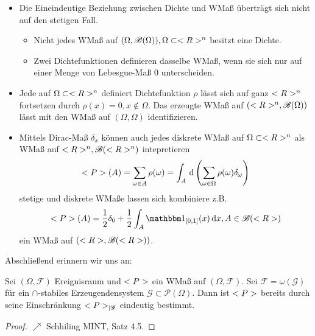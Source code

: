 \begin{*remark}
	\begin{itemize}
		\item Die Eineindeutige Beziehung zwischen Dichte und WMaß überträgt sich nicht auf den stetigen Fall.
		\begin{itemize}
			\item Nicht jedes WMaß auf $(\Omega, \mathscr{B}(\Omega)), \Omega \subset <R>^n$ besitzt eine Dichte.
			\item Zwei Dichtefunktionen definieren dasselbe WMaß, wenn sie sich nur auf einer Menge von Lebesgue-Maß $0$ unterscheiden.
		\end{itemize}
		\item Jede auf $\Omega \subset <R>^n$ definiert Dichtefunktion $\rho$ lässt sich auf ganz $<R>^n$ fortsetzen durch $\rho(x) = 0, x \not\in \Omega$. Das erzeugte WMaß auf $(<R>^n, \mathscr{B}(\Omega))$ lässt mit den WMaß auf $(\Omega, \mathscr{\Omega})$ identifizieren.
		\item Mittels Dirac-Maß $\delta_{x}$ können auch jedes diskrete WMaß auf $\Omega \subset <R>^n$ als WMaß auf $<R>^n, \mathscr{B}(<R>^n)$ intepretieren
		\begin{align}
			<P>(A) = \sum_{\omega \in A} \rho(\omega) = \int_{A} \,\mathrm{d} \left( \sum_{\omega \in \Omega} \rho(\omega)\delta_{\omega} \right)\notag
		\end{align}
		stetige und diskrete WMaße lassen sich kombiniere z.B.
		\begin{align}
			\probp(A) = \frac{1}{2} \delta_{0} + \frac{1}{2} \int_{A}\indi_{[0,1]}(x)\diff x, A \in \mathscr{B}(\R)\notag
		\end{align}
		ein WMaß auf $(<R>, \mathscr{B}(<R>))$.
	\end{itemize}
\end{*remark}

Abschließend erinnern wir uns an:

\begin{proposition}
	Sei $(\Omega, \mathscr{F})$ Ereignisraum und $<P>$ ein WMaß auf $(\Omega, \mathscr{F})$. 
	Sei $\mathscr{F} = \omega(\mathscr{G})$ für ein $\cap$-stabiles Erzeugendensystem $\mathscr{G} \subset \mathscr{P}(\Omega)$. 
	Dann ist $<P>$ bereits durch seine Einschränkung $<P>_{\mid \mathscr{G}}$ eindeutig bestimmt.
\end{proposition}

\begin{proof}
	$\nearrow$ Schhiling MINT, Satz 4.5.
\end{proof}

